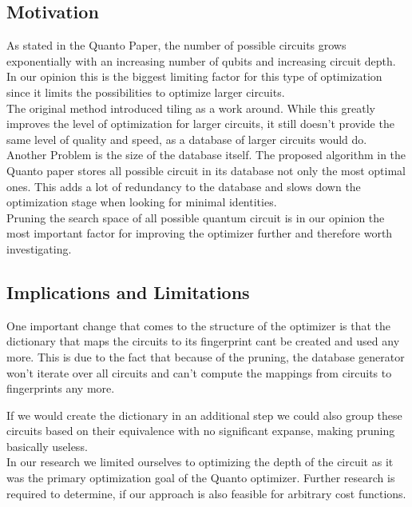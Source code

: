 \subsection{Motivation}
As stated in the Quanto Paper, the number of possible circuits grows exponentially with an increasing number of qubits and
increasing circuit depth. In our opinion this is the biggest limiting factor for this type of optimization since it limits the possibilities to optimize larger circuits.\\

The original method introduced tiling as a work around. While this greatly improves the level of optimization for larger circuits, it still doesn't provide the same level of
quality and speed, as a database of larger circuits would do.\\

Another Problem is the size of the database itself. The proposed algorithm in the Quanto paper stores all possible circuit in its database not only the most optimal ones. This adds a lot of redundancy to the database and slows down the optimization stage when looking for minimal identities.\\

Pruning the search space of all possible quantum circuit is in our opinion the most important factor for improving the optimizer further and therefore worth investigating. 

\subsection{Implications and Limitations}
One important change that comes to the structure of the optimizer is that the dictionary that maps the circuits to its fingerprint cant be created and used any more. This is due to the fact that because of the pruning, the database generator won't iterate over all circuits and can't compute the mappings from circuits to fingerprints any more.

If we would create the dictionary in an additional step we could also group these circuits based on their equivalence with no significant expanse, making pruning basically useless.\\

In our research we limited ourselves to optimizing the depth of the circuit as it was the primary optimization goal of the Quanto optimizer. Further research is required to determine, if our approach is also feasible for arbitrary cost functions.

